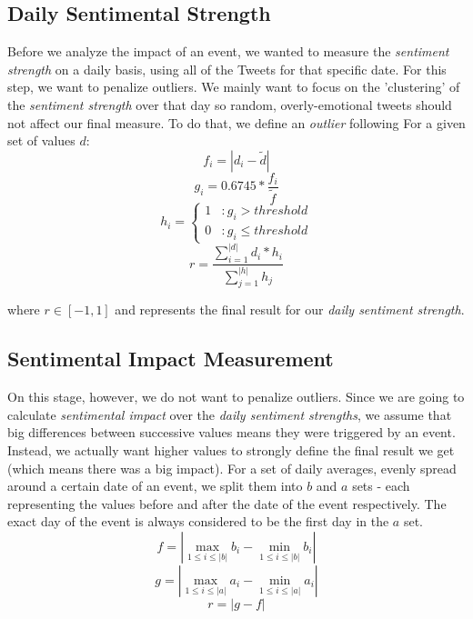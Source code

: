 \documentclass[11pt]{article}
\begin{document}
	\subsection{Daily Sentimental Strength}
	\label{sub:daily_sentiment_strength}
	Before we analyze the impact of an event, we wanted to measure the \textit{sentiment strength} on a daily basis, using all of the Tweets for that specific date. For this step, we want to penalize outliers. We mainly want to focus on the 'clustering' of the \textit{sentiment strength} over that day so random, overly-emotional tweets should not affect our final measure.
	To do that, we define an \textit{outlier} following  For a given set of values $d$:
	\begin{equation}
	f_{i} = |d_{i} - \tilde{d}|
	\end{equation} 
	\begin{equation}
	g_{i} = 0.6745 * \frac{f_{i}}{\tilde{f}}
	\end{equation}
	\begin{equation}
	h_{i} = \left\{
	\begin{array}{lr}
	1 & : g_{i} > threshold\\
	0 & : g_{i} \leq threshold
	\end{array}
	\right.
	\end{equation}
	\begin{equation}
	r = \frac{\sum_{i=1}^{|d|} d_{i} * h_{i}}{\sum_{j=1}^{|h|} h_{j}}
	\end{equation} 
	
	where $r \in [-1, 1]$ and represents the final result for our \textit{daily sentiment strength}.
	
	\subsection{Sentimental Impact Measurement}
	\label{sub:sentimental_impact_measurement}
	On this stage, however, we do not want to penalize outliers. Since we are going to calculate \textit{sentimental impact} over the \textit{daily sentiment strengths}, we assume that big differences between successive values means they were triggered by an event. Instead, we actually want higher values to strongly define the final result we get (which means there was a big impact). 
	For a set of daily averages, evenly spread around a certain date of an event, we split them into $b$ and $a$ sets - each representing the values before and after the date of the event respectively. The exact day of the event is always considered to be the first day in the $a$ set.
	\begin{equation}
	f = |\max_{1 \leq i \leq |b|} b_{i} - \min_{1 \leq i \leq |b|} b_{i}|
	\end{equation}
	\begin{equation}
	g = |\max_{1 \leq i \leq |a|} a_{i} - \min_{1 \leq i \leq |a|} a_{i}|
	\end{equation}
	\begin{equation}
	r = |g - f|
	\end{equation}
	
\end{document}
